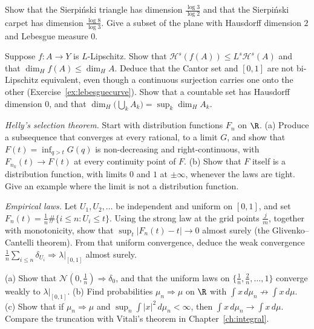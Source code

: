 \begin{exercise}[$\star\star$]\label{ex:carpet}
Show that the Sierpi\'nski triangle has dimension $\frac{\log 3}{\log 2}$ and that the Sierpi\'nski carpet has dimension
$\frac{\log 8}{\log 3}$. Give a subset of the plane with Hausdorff dimension $2$ and Lebesgue measure $0$.
\end{exercise}

\begin{exercise}[$\star$]\label{ex:lipschitzdim}
Suppose $f:A\to Y$ is $L$-Lipschitz. Show that $\mathcal H^s(f(A))\le L^s\mathcal H^s(A)$ and that $\dim_H f(A)\le\dim_H A$. Deduce that the
Cantor set and $[0,1]$ are not bi-Lipschitz equivalent, even though a continuous surjection carries one onto the other
(Exercise~\ref{ex:lebesguecurve}). Show that a countable set has Hausdorff dimension $0$, and that
$\dim_H\bigl(\bigcup_k A_k\bigr)=\sup_k\dim_H A_k$.
\end{exercise}

\begin{exercise}[$\star\star$]\label{ex:helly}
\emph{Helly's selection theorem.} Start with distribution functions $F_n$ on $\R$. (a) Produce a subsequence that converges at every rational, to
a limit $G$, and show that $F(t)=\inf_{q>t}G(q)$ is non-decreasing and right-continuous, with $F_{n_k}(t)\to F(t)$ at every continuity point
of $F$. (b) Show that $F$ itself is a distribution function, with limits $0$ and $1$ at $\pm\infty$, whenever the laws are tight. Give an
example where the limit is not a distribution function.
\end{exercise}

\begin{exercise}[$\star\star$]\label{ex:glivenko}
\emph{Empirical laws.} Let $U_1,U_2,\ldots$ be independent and uniform on $[0,1]$, and set
$F_n(t)=\frac1n\#\{i\le n:U_i\le t\}$. Using the strong law at the grid points $\frac jm$, together with monotonicity, show that
$\sup_t|F_n(t)-t|\to 0$ almost surely (the Glivenko--Cantelli theorem). From that uniform convergence, deduce the weak convergence
$\frac1n\sum_{i\le n}\delta_{U_i}\Rightarrow\lambda|_{[0,1]}$ almost surely.
\end{exercise}

\begin{exercise}[$\star\star$]\label{ex:weakexamples}
(a) Show that $\mathcal N(0,\frac1n)\Rightarrow\delta_0$, and that the uniform laws on $\{\frac1n,\frac2n,\ldots,1\}$ converge weakly to
$\lambda|_{[0,1]}$. (b) Find probabilities $\mu_n\Rightarrow\mu$ on $\R$ with $\int x\,d\mu_n\not\to\int x\,d\mu$. (c) Show that if
$\mu_n\Rightarrow\mu$ and $\sup_n\int|x|^2\,d\mu_n<\infty$, then $\int x\,d\mu_n\to\int x\,d\mu$. Compare the truncation with Vitali's theorem
in Chapter~\ref{ch:integral}.
\end{exercise}

